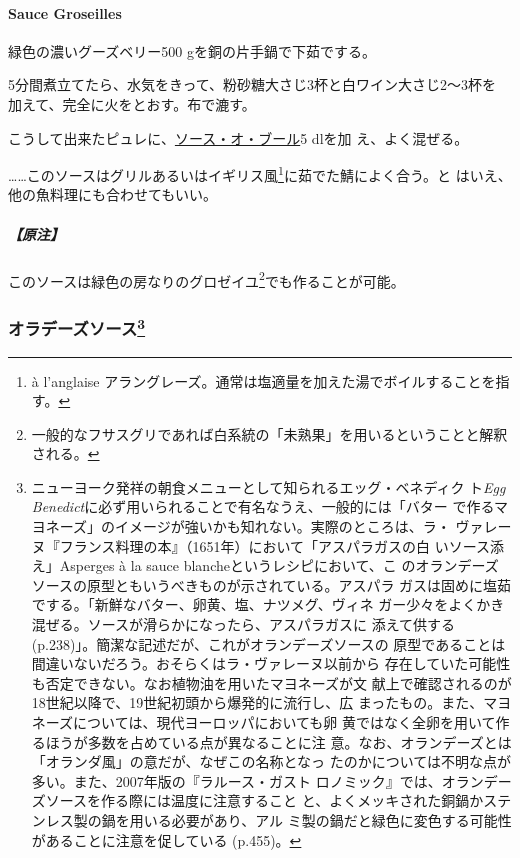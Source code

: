 \begin{recette}
\hypertarget{sauce-groseilles}{%
\paragraph{Sauce Groseilles}\label{sauce-groseilles}}


緑色の濃いグーズベリー500 gを銅の片手鍋で下茹でする。

5分間煮立てたら、水気をきって、粉砂糖大さじ3杯と白ワイン大さじ2〜3杯を
加えて、完全に火をとおす。布で漉す。

こうして出来たピュレに、\protect\hyperlink{sauce-au-beurre}{ソース・オ・ブール}5
dlを加 え、よく混ぜる。

\ldots{}\ldots{}このソースはグリルあるいはイギリス風\footnote{à
  l'anglaise
  アラングレーズ。通常は塩適量を加えた湯でボイルすることを指す。}に茹でた鯖によく合う。と
はいえ、他の魚料理にも合わせてもいい。

\hypertarget{ux539fux6ce8-8}{%
\subparagraph{【原注】}\label{ux539fux6ce8-8}}

このソースは緑色の房なりのグロゼイユ\footnote{一般的なフサスグリであれば白系統の「未熟果」を用いるということと解釈される。}でも作ることが可能。

\maeaki

\hypertarget{ux30aaux30e9ux30c7ux30fcux30baux30bdux30fcux30b954}{%
\subsubsection[オラデーズソース]{\texorpdfstring{オラデーズソース\footnote{ニューヨーク発祥の朝食メニューとして知られるエッグ・ベネディク
  ト\emph{Egg
  Benedict}に必ず用いられることで有名なうえ、一般的には「バター
  で作るマヨネーズ」のイメージが強いかも知れない。実際のところは、ラ・
  ヴァレーヌ『フランス料理の本』（1651年）において「アスパラガスの白
  いソース添え」Asperges à la sauce blancheというレシピにおいて、こ
  のオランデーズソースの原型ともいうべきものが示されている。アスパラ
  ガスは固めに塩茹でする。「新鮮なバター、卵黄、塩、ナツメグ、ヴィネ
  ガー少々をよくかき混ぜる。ソースが滑らかになったら、アスパラガスに
  添えて供する(p.238)」。簡潔な記述だが、これがオランデーズソースの
  原型であることは間違いないだろう。おそらくはラ・ヴァレーヌ以前から
  存在していた可能性も否定できない。なお植物油を用いたマヨネーズが文
  献上で確認されるのが18世紀以降で、19世紀初頭から爆発的に流行し、広
  まったもの。また、マヨネーズについては、現代ヨーロッパにおいても卵
  黄ではなく全卵を用いて作るほうが多数を占めている点が異なることに注
  意。なお、オランデーズとは「オランダ風」の意だが、なぜこの名称となっ
  たのかについては不明な点が多い。また、2007年版の『ラルース・ガスト
  ロノミック』では、オランデーズソースを作る際には温度に注意すること
  と、よくメッキされた銅鍋かステンレス製の鍋を用いる必要があり、アル
  ミ製の鍋だと緑色に変色する可能性があることに注意を促している (p.455)。}}{オラデーズソース}}\label{ux30aaux30e9ux30c7ux30fcux30baux30bdux30fcux30b954}}


\end{recette}
